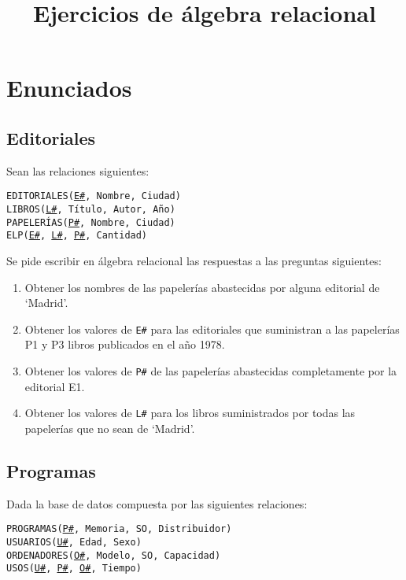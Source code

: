 \documentclass{db-practice}
\title{Ejercicios de álgebra relacional}
\begin{document}
\maketitle

\section{Enunciados}

\subsection{Editoriales}

Sean las relaciones siguientes:

\begin{addmargin}[1.5em]{0em}
    \texttt{EDITORIALES(\underline{E\#}, Nombre, Ciudad)}\\
    \texttt{LIBROS(\underline{L\#}, Título, Autor, Año)}\\
    \texttt{PAPELERÍAS(\underline{P\#}, Nombre, Ciudad)}\\
    \texttt{ELP(\underline{E\#}, \underline{L\#}, \underline{P\#}, Cantidad)}
\end{addmargin}


Se pide escribir en álgebra relacional las respuestas a las preguntas siguientes:

\begin{enumerate}
    \item Obtener los nombres de las papelerías abastecidas por alguna editorial de `Madrid'.
    \item Obtener los valores de \texttt{E\#} para las editoriales que suministran a las papelerías P1 y P3 libros publicados en el año 1978.
    \item Obtener los valores de \texttt{P\#} de las papelerías abastecidas completamente por la editorial E1.
    \item Obtener los valores de \texttt{L\#} para los libros suministrados por todas las papelerías que no sean de `Madrid'.
\end{enumerate}

\subsection{Programas}

Dada la base de datos compuesta por las siguientes relaciones:

\begin{addmargin}[1.5em]{0em}
    \texttt{PROGRAMAS(\underline{P\#}, Memoria, SO, Distribuidor)}\\
    \texttt{USUARIOS(\underline{U\#}, Edad, Sexo)}\\
    \texttt{ORDENADORES(\underline{O\#}, Modelo, SO, Capacidad)}\\
    \texttt{USOS(\underline{U\#}, \underline{P\#}, \underline{O\#}, Tiempo)}
\end{addmargin}
\end{document}
